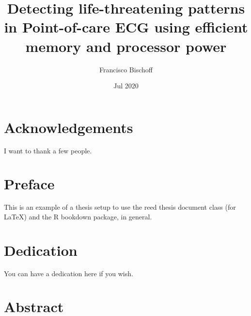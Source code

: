 \documentclass[12pt,twoside]{reedthesis}
\title{Detecting life-threatening patterns in Point-of-care ECG using efficient memory and processor power}
\author{Francisco Bischoff}
\date{Jul 2020}
\begin{document}
  \maketitle

\frontmatter %
\pagestyle{empty} %



  \hypersetup{linkcolor=black}
  \setcounter{secnumdepth}{2}
  \setcounter{tocdepth}{2}
  \tableofcontents

  \listoftables

  \listoffigures



\mainmatter %
\pagestyle{fancyplain} %

\hypertarget{acknowledgements}{%
\section*{Acknowledgements}\label{acknowledgements}}

I want to thank a few people.

\hypertarget{preface}{%
\section*{Preface}\label{preface}}

This is an example of a thesis setup to use the reed thesis document class (for LaTeX) and the R bookdown package, in
general.

\hypertarget{dedication}{%
\section*{Dedication}\label{dedication}}

You can have a dedication here if you wish.

\hypertarget{abstract}{%
\section*{Abstract}\label{abstract}}
\end{document}
